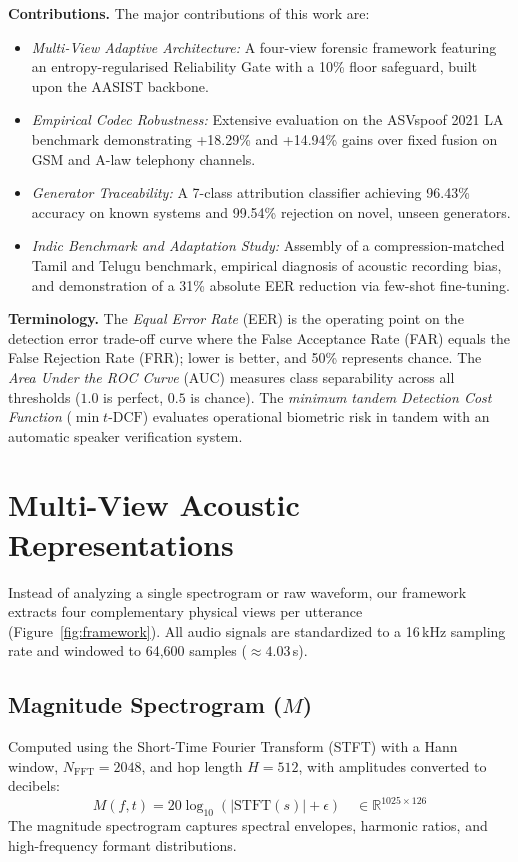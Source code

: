 \documentclass[conference]{IEEEtran}
\begin{document}
\textbf{Contributions.} The major contributions of this work are:
\begin{itemize}
    \item \emph{Multi-View Adaptive Architecture:} A four-view forensic framework featuring an entropy-regularised Reliability Gate with a 10\% floor safeguard, built upon the AASIST backbone.
    \item \emph{Empirical Codec Robustness:} Extensive evaluation on the ASVspoof 2021 LA benchmark demonstrating +18.29\% and +14.94\% gains over fixed fusion on GSM and A-law telephony channels.
    \item \emph{Generator Traceability:} A 7-class attribution classifier achieving 96.43\% accuracy on known systems and 99.54\% rejection on novel, unseen generators.
    \item \emph{Indic Benchmark and Adaptation Study:} Assembly of a compression-matched Tamil and Telugu benchmark, empirical diagnosis of acoustic recording bias, and demonstration of a 31\% absolute EER reduction via few-shot fine-tuning.
\end{itemize}

\textbf{Terminology.} The \emph{Equal Error Rate} (EER) is the operating point on the detection error trade-off curve where the False Acceptance Rate (FAR) equals the False Rejection Rate (FRR); lower is better, and 50\% represents chance. The \emph{Area Under the ROC Curve} (AUC) measures class separability across all thresholds ($1.0$ is perfect, $0.5$ is chance). The \emph{minimum tandem Detection Cost Function} ($\min t\text{-DCF}$) evaluates operational biometric risk in tandem with an automatic speaker verification system.

\section{Multi-View Acoustic Representations}

Instead of analyzing a single spectrogram or raw waveform, our framework extracts four complementary physical views per utterance (Figure~\ref{fig:framework}). All audio signals are standardized to a 16\,kHz sampling rate and windowed to 64,600 samples ($\approx 4.03$\,s).

\subsection{Magnitude Spectrogram ($M$)}
Computed using the Short-Time Fourier Transform (STFT) with a Hann window, $N_{\text{FFT}} = 2048$, and hop length $H = 512$, with amplitudes converted to decibels:
\begin{equation}
    M(f, t) = 20 \log_{10} \left( |\text{STFT}(s)| + \epsilon \right) \quad \in \mathbb{R}^{1025 \times 126}
\end{equation}
The magnitude spectrogram captures spectral envelopes, harmonic ratios, and high-frequency formant distributions.
\end{document}
